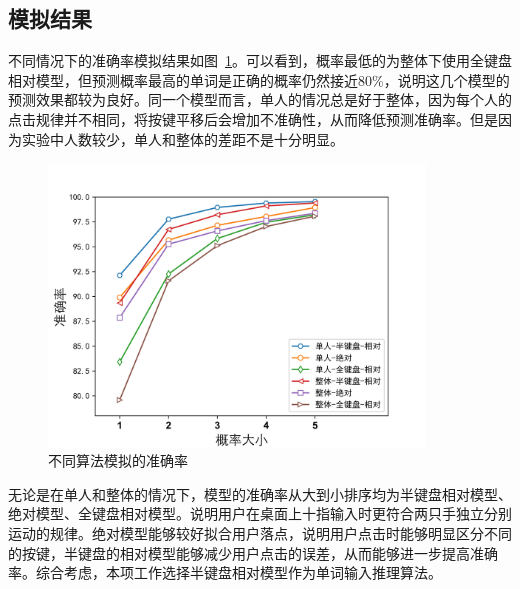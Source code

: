 \subsection{模拟结果}
不同情况下的准确率模拟结果如图~\ref{fig:simulation}。可以看到，概率最低的为整体下使用全键盘相对模型，但预测概率最高的单词是正确的概率仍然接近80\%，说明这几个模型的预测效果都较为良好。同一个模型而言，单人的情况总是好于整体，因为每个人的点击规律并不相同，将按键平移后会增加不准确性，从而降低预测准确率。但是因为实验中人数较少，单人和整体的差距不是十分明显。

\begin{figure}[h] %
    \centering
    \includegraphics[width=10cm]{figures/acc.jpg}
    \caption{不同算法模拟的准确率}
    \label{fig:simulation}
\end{figure}

无论是在单人和整体的情况下，模型的准确率从大到小排序均为半键盘相对模型、绝对模型、全键盘相对模型。说明用户在桌面上十指输入时更符合两只手独立分别运动的规律。绝对模型能够较好拟合用户落点，说明用户点击时能够明显区分不同的按键，半键盘的相对模型能够减少用户点击的误差，从而能够进一步提高准确率。综合考虑，本项工作选择半键盘相对模型作为单词输入推理算法。
